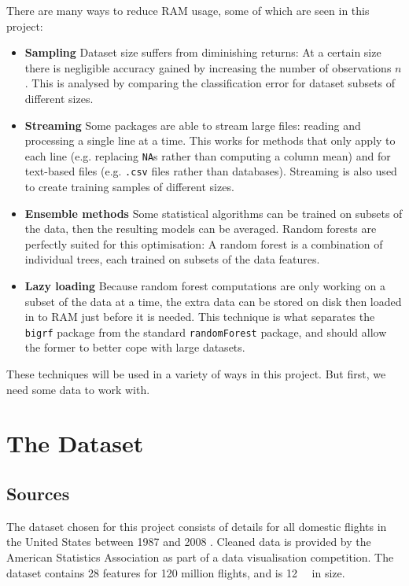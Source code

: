 \documentclass{article}
\begin{document}
There are many ways to reduce RAM usage, some of which are seen in this project:
\begin{itemize}
    \item[] \textbf{Sampling} Dataset size suffers from diminishing returns: At a certain size there is negligible accuracy gained by increasing the number of observations $n$. This is analysed by comparing the classification error for dataset subsets of different sizes.
    \item[] \textbf{Streaming} Some packages are able to stream large files: reading and processing a single line at a time. This works for methods that only apply to each line (e.g. replacing \texttt{NA}s rather than computing a column mean) and for text-based files (e.g. \texttt{.csv} files rather than databases). Streaming is also used to create training samples of different sizes.
    \item[] \textbf{Ensemble methods} Some statistical algorithms can be trained on subsets of the data, then the resulting models can be averaged. Random forests are perfectly suited for this optimisation: A random forest is a combination of individual trees, each trained on subsets of the data features. 
    \item[] \textbf{Lazy loading} Because random forest computations are only working on a subset of the data at a time, the extra data can be stored on disk then loaded in to RAM just before it is needed. This technique is what separates the \texttt{bigrf} package from the standard \texttt{randomForest} package, and should allow the former to better cope with large datasets.
    
\end{itemize}

These techniques will be used in a variety of ways in this project. But first, we need some data to work with.

\section{The Dataset}
\subsection{Sources}
The dataset chosen for this project consists of details for all domestic flights in the United States between 1987 and 2008 \cite{asa}. Cleaned data is provided by the American Statistics Association as part of a data visualisation competition. The dataset contains 28 features for 120 million flights, and is \SI{12}{\giga\byte} in size.
\end{document}

